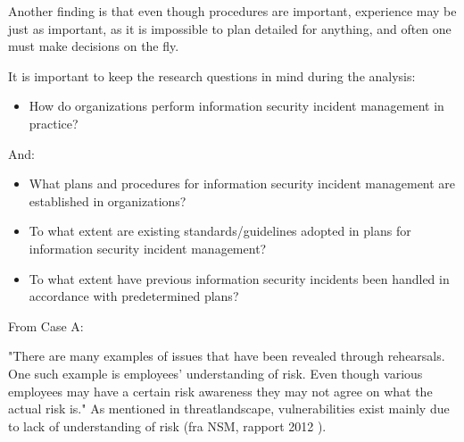Another finding is that even though procedures are important, experience may be just as important, as it is impossible to plan detailed for anything, and often one must make decisions on the fly.

It is important to keep the research questions in mind during the analysis:

\begin{itemize}
\item How do organizations perform information security incident management in practice?
\end{itemize}

And:

\begin{itemize}\itemsep-0.1cm
\item What plans and procedures for information security incident management are established in organizations?
\item To what extent are existing standards/guidelines adopted in plans for information security incident management?
\item To what extent have previous information security incidents been handled in accordance with predetermined plans? 
\end{itemize}

From Case A:

"There are many examples of issues that have been revealed through rehearsals. One such example is employees' understanding of risk. Even though various employees may have a certain risk awareness they may not agree on what the actual risk is."
As mentioned in threatlandscape, vulnerabilities exist mainly due to lack of understanding of risk (fra NSM, rapport 2012 \cite{NSMRapport2012}).
